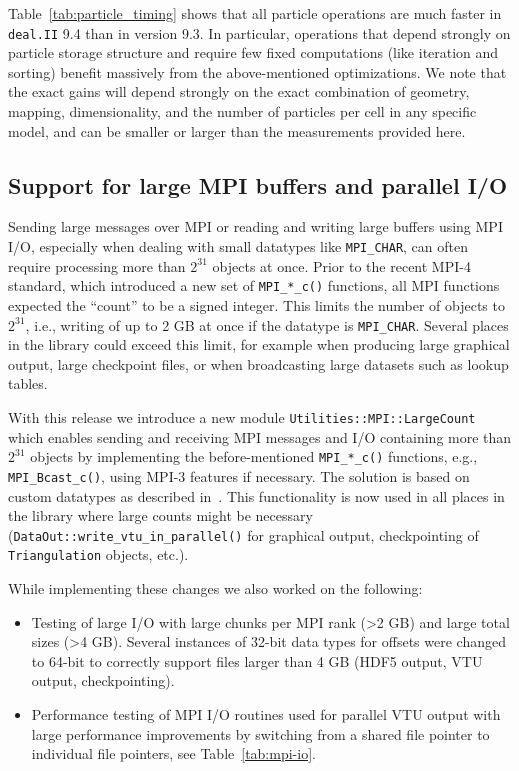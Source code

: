 \documentclass{ansarticle-preprint}
\newcommand{\specialword}[1]{\texttt{#1}}
\newcommand{\dealii}{{\specialword{deal.II}}\xspace}
\begin{document}
Table~\ref{tab:particle_timing} shows that all particle operations are
much faster in \dealii 9.4 than in version 9.3. In particular, operations that depend strongly on particle storage structure and require few fixed computations (like iteration and sorting) benefit massively from the above-mentioned optimizations. We note that the exact gains will depend strongly on the exact combination of geometry, mapping, dimensionality, and the number of particles per cell in any specific model, and can be smaller or larger than the measurements provided here.


\subsection{Support for large MPI buffers and parallel I/O}
\label{sec:large-mpi}

   Sending large messages over MPI or reading and writing large buffers using MPI I/O,
   especially when dealing with small datatypes like \texttt{MPI\_CHAR},
   can often require processing more than $2^{31}$ objects at once. Prior
   to the recent MPI-4 standard, which introduced a new set of \texttt{MPI\_*\_c()} functions, all MPI functions expected the ``count''
   to be a signed integer. This limits the number of objects to $2^{31}$,
   i.e., writing of up to 2 GB at once if the datatype is \texttt{MPI\_CHAR}.
   Several places in the library could exceed this limit,
   for example when producing large graphical output, large
   checkpoint files, or when broadcasting large datasets such as lookup tables.

   With this release we introduce a new module \texttt{Utilities::MPI::LargeCount} which enables sending and receiving MPI messages and I/O containing more than $2^{31}$ objects by implementing
   the before-mentioned \texttt{MPI\_*\_c()} functions, e.g., \texttt{MPI\_Bcast\_c()}, using MPI-3 features if necessary. The
   solution is based on custom datatypes as described in~\cite{hammond2014int_max}.
This functionality is now used in all places in the library where
   large counts might be necessary (\texttt{DataOut::write\_vtu\_in\_parallel()} for graphical output, checkpointing of \texttt{Triangulation} objects, etc.).
   
   While implementing these changes we also worked on the following:
   \begin{itemize}
    \item Testing of large I/O with large chunks per MPI rank (>2 GB) and
    large total sizes (>4 GB). Several instances of 32-bit data types for
    offsets were changed to 64-bit to correctly support files larger
    than 4 GB (HDF5 output, VTU output, checkpointing).
    \item Performance testing of MPI I/O routines used for parallel VTU output with large performance improvements by switching from a shared
    file pointer to individual file pointers, see Table~\ref{tab:mpi-io}.
   \end{itemize}
\end{document}
